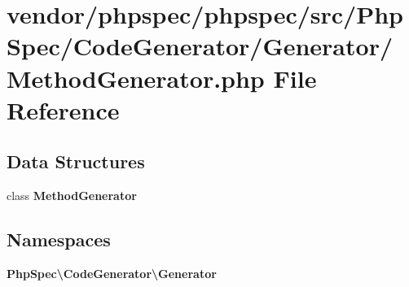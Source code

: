 \section{vendor/phpspec/phpspec/src/\+Php\+Spec/\+Code\+Generator/\+Generator/\+Method\+Generator.php File Reference}
\label{_method_generator_8php}
\subsection*{Data Structures}
\begin{DoxyCompactItemize}
\item 
class {\bf Method\+Generator}
\end{DoxyCompactItemize}
\subsection*{Namespaces}
\begin{DoxyCompactItemize}
\item 
 {\bf Php\+Spec\textbackslash{}\+Code\+Generator\textbackslash{}\+Generator}
\end{DoxyCompactItemize}
